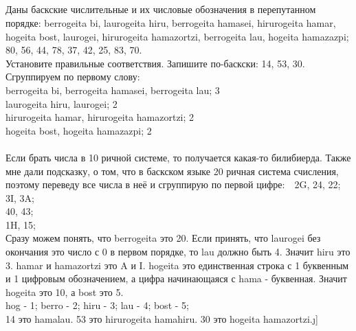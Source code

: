 \documentclass[a4paper,12pt]{article} %
\begin{document}
	\subsection{}{Даны баскские числительные и их числовые обозначения в перепутанном порядке: berrogeita bi, laurogeita hiru, berrogeita hamasei, hirurogeita hamar, hogeita bost, laurogei, hirurogeita hamazortzi, berrogeita lau, hogeita hamazazpi; \\ 80, 56, 44, 78, 37, 42, 25, 83, 70. \\ Установите правильные соответствия. Запишите по-баскски: 14, 53, 30.\\
		
		Сгруппируем по первому слову: \\
		berrogeita bi, berrogeita hamasei, berrogeita lau; 3\\
		laurogeita hiru, laurogei; 2\\
		hirurogeita hamar, hirurogeita hamazortzi; 2\\
		hogeita bost, hogeita hamazazpi; 2\\\\
		Если брать числа в 10 ричной системе, то получается какая-то билибиерда. Также мне дали подсказку, о том, что в баскском языке 20 ричная система счисления, поэтому переведу все числа в неё и сгруппирую по первой цифре:\	\
		2G, 24, 22;\\
		3I, 3A; \\
		40, 43;\\
		1H, 15;\\
		
		Сразу можем понять, что	berrogeita это 20. Если принять, что laurogei без окончания это число с 0 в первом порядке, то lau должно быть 4. Значит hiru это 3. hamar и hamazortzi это A и I. hogeita это единственная строка с 1 буквенным и 1 цифровым обозначением, а цифра начинающаяся с hama - буквенная. Значит hogeita это 10, а bost это 5.\\
		hog - 1; berro - 2; hiru - 3; lau - 4; bost - 5;\\
		14 это hamalau. 53 это hirurogeita hamahiru. 30 это hogeita hamazortzi.\j]
	}
	
\end{document}
